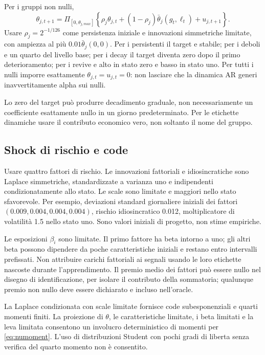 \documentclass[11pt,a4paper]{article}
\theoremstyle{definition}\newtheorem{definition}[theorem]{Definizione}
\theoremstyle{remark}\newtheorem{remark}[theorem]{Osservazione}
\begin{document}
Per i gruppi non nulli,
\begin{equation}
 \theta_{j,t+1}=\Pi_{[0,\theta_{j,max}]}
 \left\{\rho_j\theta_{j,t}+(1-\rho_j)\bar\theta_j(g_t,\ell_t)+u_{j,t+1}\right\}.\label{eq:decay}
\end{equation}
Usare $\rho_j=2^{-1/126}$ come persistenza iniziale e innovazioni simmetriche limitate, con ampiezza al più $0.01\bar\theta_j(0,0)$. Per i persistenti il target e stabile; per i deboli e un quarto del livello base; per i decay il target diventa zero dopo il primo deterioramento; per i revive e alto in stato zero e basso in stato uno. Per tutti i nulli imporre esattamente $\theta_{j,t}=u_{j,t}=0$: non lasciare che la dinamica AR generi inavvertitamente alpha sui nulli.

Lo zero del target può produrre decadimento graduale, non necessariamente un coefficiente esattamente nullo in un giorno predeterminato. Per le etichette dinamiche usare il contributo economico vero, non soltanto il nome del gruppo.

\subsection{Shock di rischio e code}
Usare quattro fattori di rischio. Le innovazioni fattoriali e idiosincratiche sono Laplace simmetriche, standardizzate a varianza uno e indipendenti condizionatamente allo stato. Le scale sono limitate e maggiori nello stato sfavorevole. Per esempio, deviazioni standard giornaliere iniziali dei fattori $(0.009,0.004,0.004,0.004)$, rischio idiosincratico 0.012, moltiplicatore di volatilità 1.5 nello stato uno. Sono valori iniziali di progetto, non stime empiriche.

Le esposizioni $\beta_i$ sono limitate. Il primo fattore ha beta intorno a uno; gli altri beta possono dipendere da poche caratteristiche iniziali e restano entro intervalli prefissati. Non attribuire carichi fattoriali ai segnali usando le loro etichette nascoste durante l'apprendimento. Il premio medio dei fattori può essere nullo nel disegno di identificazione, per isolare il contributo della sommatoria; qualunque premio non nullo deve essere dichiarato e incluso nell'oracle.

La Laplace condizionata con scale limitate fornisce code subesponenziali e quarti momenti finiti. La proiezione di $\theta$, le caratteristiche limitate, i beta limitati e la leva limitata consentono un involucro deterministico di momenti per \eqref{eq:numoment}. L'uso di distribuzioni Student con pochi gradi di liberta senza verifica del quarto momento non è consentito.
\end{document}
